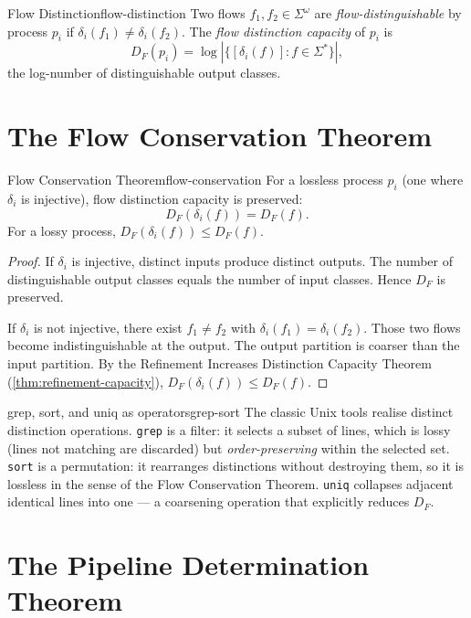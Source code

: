 \documentclass[12pt,twoside,openright]{book}
\newcommand{\csicon} {\marginpar{\tiny\color{DistBlue}\faCode}}
\begin{document}
\begin{definition}{Flow Distinction}{flow-distinction}
  Two flows $f_1, f_2 \in \Sigma^\omega$ are
  \emph{flow-distinguishable} by process $p_i$ if
  $\delta_i(f_1) \ne \delta_i(f_2)$.
  The \emph{flow distinction capacity} of $p_i$ is
  \[
    D_F(p_i) = \log|\{[\delta_i(f)] : f \in \Sigma^*\}|,
  \]
  the log-number of distinguishable output classes.
\end{definition}

\section{The Flow Conservation Theorem}

\begin{theorem}{Flow Conservation Theorem}{flow-conservation}
  For a lossless process $p_i$ (one where $\delta_i$ is
  injective), flow distinction capacity is preserved:
  \[
    D_F(\delta_i(f)) = D_F(f).
  \]
  For a lossy process, $D_F(\delta_i(f)) \le D_F(f)$.
\end{theorem}

\begin{proof}
  If $\delta_i$ is injective, distinct inputs produce
  distinct outputs. The number of distinguishable output
  classes equals the number of input classes.
  Hence $D_F$ is preserved.

  If $\delta_i$ is not injective, there exist
  $f_1 \ne f_2$ with $\delta_i(f_1) = \delta_i(f_2)$.
  Those two flows become indistinguishable at the output.
  The output partition is coarser than the input partition.
  By the Refinement Increases Distinction Capacity Theorem
  (\cref{thm:refinement-capacity}),
  $D_F(\delta_i(f)) \le D_F(f)$.
\end{proof}

\begin{remark}{grep, sort, and uniq as operators}{grep-sort}
  \csicon
  The classic Unix tools realise distinct distinction
  operations. \texttt{grep} is a filter: it selects a
  subset of lines, which is lossy (lines not matching are
  discarded) but \emph{order-preserving} within the
  selected set. \texttt{sort} is a permutation: it
  rearranges distinctions without destroying them, so it
  is lossless in the sense of the Flow Conservation
  Theorem. \texttt{uniq} collapses adjacent identical
  lines into one — a coarsening operation that explicitly
  reduces $D_F$.
\end{remark}

\section{The Pipeline Determination Theorem}
\end{document}
